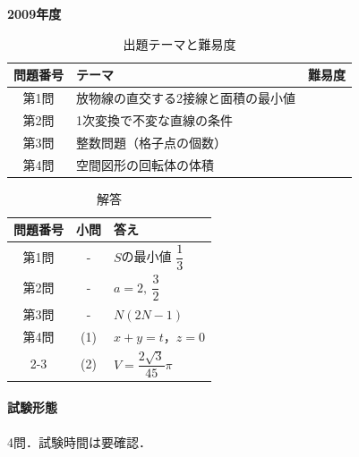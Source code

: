 \documentclass[../../main.tex]{subfiles}
\begin{document}
\begin{center}
  {\fontsize{48pt}{58pt}\selectfont \textbf{2009}\normalsize\textbf{年度}}
\end{center}

\begin{table}[htb]
  \centering
  \caption{出題テーマと難易度}
  \begin{tabular}{|c|p{9cm}|c|}
    \hline
    \textbf{問題番号} & \textbf{テーマ} & \textbf{難易度} \\
    \hline
    第1問 & 放物線の直交する2接線と面積の最小値 & \\
    \hline
    第2問 & 1次変換で不変な直線の条件 & \\
    \hline
    第3問 & 整数問題（格子点の個数） & \\
    \hline
    第4問 & 空間図形の回転体の体積 & \\
    \hline
  \end{tabular}
\end{table}

\begin{table}[htb]
  \centering
  \caption{解答}
  \renewcommand{\arraystretch}{1.4}
  \begin{tabular}{|c|c|p{9cm}|}
    \hline
    \textbf{問題番号} & \textbf{小問} & \textbf{答え} \\
    \hline
    第1問 & - & $S$の最小値 $\dfrac{1}{3}$ \\
    \hline
    第2問 & - & $a=2,\ \dfrac{3}{2}$ \\
    \hline
    第3問 & - & $N(2N-1)$ \\
    \hline
    第4問 & (1) & $x+y=t$，$z=0$ \\
    \cline{2-3}
    & (2) & $V=\dfrac{2\sqrt{3}}{45}\pi$ \\
    \hline
  \end{tabular}
\end{table}

\paragraph{試験形態}
4問．試験時間は要確認．
\end{document}

